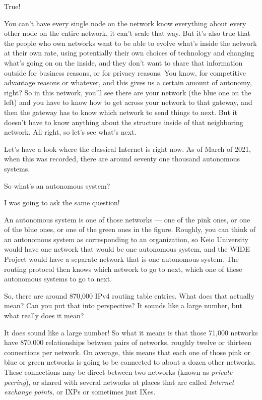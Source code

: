 \mmm True!

\rrr You can't have every single node on the network know everything about every other node on the entire network, it can't scale that way. But it's also true that the people who own networks want to be able to evolve what's inside the network at their own rate, using potentially their own choices of technology and changing what's going on on the inside, and they don't want to share that information outside for business reasons, or for privacy reasons. You know, for competitive advantage reasons or whatever, and this gives us a certain amount of autonomy, right? So in this network, you'll see there are your network (the blue one on the left) and you have to know how to get across your network to that gateway, and then the gateway has to know which network to send things to next. But it doesn't have to know anything about the structure inside of that neighboring network. All right, so let's see what's next.

\mmm Let's have a look where the classical Internet is right now. As of March of 2021, when this was recorded, there are around seventy one thousand autonomous systems.

\rrr So what's an autonomous system?

\mmm I was going to ask the same question!

\rrr An autonomous system is one of those networks --- one of the pink ones, or one of the blue ones, or one of the green ones in the figure. Roughly, you can think of an autonomous system as corresponding to an organization, so Keio University would have one network that would be one autonomous system, and the WIDE Project would have a separate network that is one autonomous system. The routing protocol then knows which network to go to next, which one of these autonomous systems to go to next.

\mmm So, there are around 870,000 IPv4 routing table entries. What does that actually mean? Can you put that into perspective? It sounds like a large number, but what really does it mean?

\rrr It does sound like a large number! So what it means is that those 71,000 networks have 870,000 relationships between pairs of networks, roughly twelve or thirteen connections per network. On average, this means that each one of those pink or blue or green networks is going to be connected to about a dozen other networks. These connections may be direct between two networks (known as \emph{private peering}), or shared with several networks at places that are called \emph{Internet exchange points}, or IXPs or sometimes just IXes.

